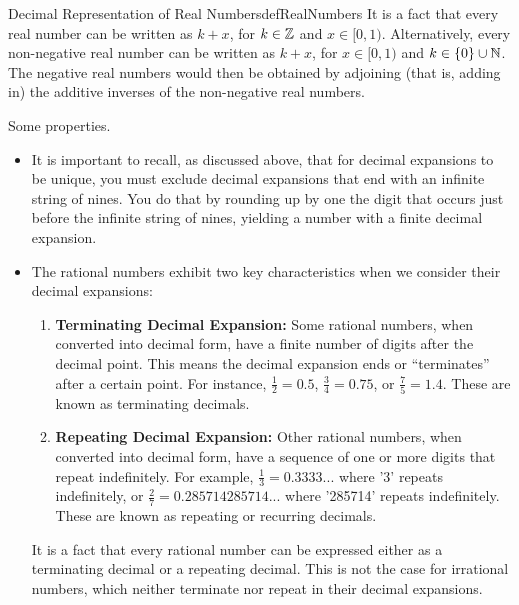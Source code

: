 \begin{factColor}{Decimal Representation of Real Numbers}{defRealNumbers}
    It is a fact that every real number can be written as $k + x$, for $k \in \mathbb Z$ and $x \in [0, 1).$ Alternatively, every non-negative real number can be written as $k + x$, for $x \in [0, 1)$ and $k \in \{0\} \cup \mathbb N$. The negative real numbers would then be obtained by adjoining (that is, adding in) the additive inverses of the non-negative real numbers.

    \begin{rem} Some properties.
    \begin{itemize}
        \item It is important to recall, as discussed above, that for decimal expansions to be unique, you must exclude decimal expansions that end with an infinite string of nines. You do that by rounding up by one the digit that occurs just before the infinite string of nines, yielding a number with a finite decimal expansion.

        \item The rational numbers exhibit two key characteristics when we consider their decimal expansions:

\begin{enumerate}
\renewcommand{\labelenumi}{(\alph{enumi})}
\setlength{\itemsep}{.2cm}
    \item \textbf{Terminating Decimal Expansion:} Some rational numbers, when converted into decimal form, have a finite number of digits after the decimal point. This means the decimal expansion ends or ``terminates'' after a certain point. For instance, $\frac{1}{2} = 0.5$, $\frac{3}{4} = 0.75$, or $\frac{7}{5} = 1.4$. These are known as terminating decimals.
    
    \item \textbf{Repeating Decimal Expansion:} Other rational numbers, when converted into decimal form, have a sequence of one or more digits that repeat indefinitely. For example, $\frac{1}{3} = 0.3333...$ where '3' repeats indefinitely, or $\frac{2}{7} = 0.285714285714...$ where '285714' repeats indefinitely. These are known as repeating or recurring decimals.
\end{enumerate}

It is a fact that every rational number can be expressed either as a terminating decimal or a repeating decimal. This is not the case for irrational numbers, which neither terminate nor repeat in their decimal expansions.

    \end{itemize}
        
    \end{rem}
\end{factColor}
\bigskip

